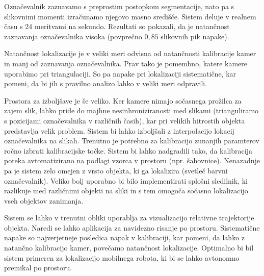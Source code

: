 \documentclass[a4paper, 12pt]{book}
\begin{document}
Označevalnik zaznavamo s preprostim postopkom segmentacije, nato pa s slikovnimi momenti izračunamo njegovo masno središče. Sistem deluje v realnem času s 24 meritvami na sekundo. Rezultati so pokazali, da je natančnost zaznavanja označevalnika visoka (povprečno $0,85$ slikovnih pik napake).

Natančnost lokalizacije je v veliki meri odvisna od natančnosti kalibracije kamer in manj od zaznavanja označevalnika. Prav tako je pomembno, katere kamere uporabimo pri triangulaciji. So pa napake pri lokalizaciji sistematične, kar pomeni, da bi jih s pravilno analizo lahko v veliki meri odpravili.

Prostora za izboljšave je še veliko. Ker kamere nimajo sočasnega prožilca za zajem slik, lahko pride do majhne nesinhroniziranosti med slikami (trianguliramo s pozicijami označevalnika v različnih časih), kar pri velikih hitrostih objekta predstavlja velik problem. Sistem bi lahko izboljšali z interpolacijo lokacij označevalnika na slikah. Trenutno je potrebno za kalibracijo zunanjih paramterov ročno izbrati kalibracijske točke. Sistem bi lahko nadgradili tako, da kalibracija poteka avtomatizirano na podlagi vzorca v prostoru (npr. šahovnice). Nenazadnje pa je sistem zelo omejen z vrsto objekta, ki ga lokalizira (svetleč barvni označevalnik). Veliko bolj uporabno bi bilo implementirati splošni sledilnik, ki razlikuje med različnimi objekti na sliki in s tem omogoča sočasno lokalizacijo vseh objektov zanimanja.

Sistem se lahko v trenutni obliki uporablja za vizualizacijo relativne trajektorije objekta. Naredi se lahko aplikacija za navidezno risanje po prostoru. Sistematične napake so najverjetneje posledica napak v kalibraciji, kar pomeni, da lahko z natančno kalibracijo kamer, povečamo natančnost lokalizacije. Optimalno bi bil sistem primeren za lokalizacijo mobilnega robota, ki bi se lahko avtonomno premikal po prostoru.

{}

\end{document}
